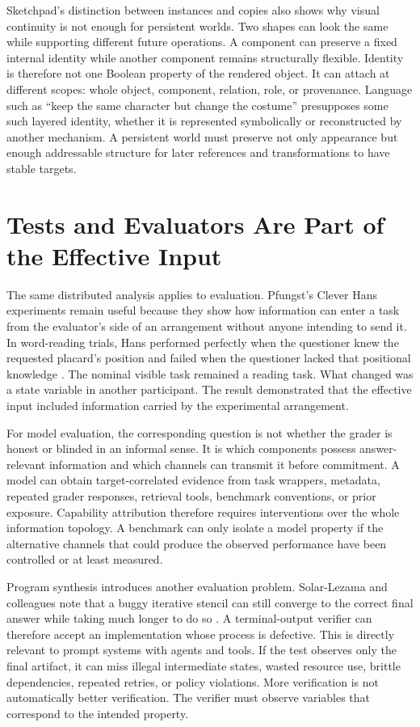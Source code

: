 \documentclass[11pt]{article}
\begin{document}
Sketchpad's distinction between instances and copies also shows why visual continuity is not enough for persistent worlds. Two shapes can look the same while supporting different future operations. A component can preserve a fixed internal identity while another component remains structurally flexible. Identity is therefore not one Boolean property of the rendered object. It can attach at different scopes: whole object, component, relation, role, or provenance. Language such as ``keep the same character but change the costume'' presupposes some such layered identity, whether it is represented symbolically or reconstructed by another mechanism. A persistent world must preserve not only appearance but enough addressable structure for later references and transformations to have stable targets.

\section{Tests and Evaluators Are Part of the Effective Input}

The same distributed analysis applies to evaluation. Pfungst's Clever Hans experiments remain useful because they show how information can enter a task from the evaluator's side of an arrangement without anyone intending to send it. In word-reading trials, Hans performed perfectly when the questioner knew the requested placard's position and failed when the questioner lacked that positional knowledge \citep{pfungst1911clever}. The nominal visible task remained a reading task. What changed was a state variable in another participant. The result demonstrated that the effective input included information carried by the experimental arrangement.

For model evaluation, the corresponding question is not whether the grader is honest or blinded in an informal sense. It is which components possess answer-relevant information and which channels can transmit it before commitment. A model can obtain target-correlated evidence from task wrappers, metadata, repeated grader responses, retrieval tools, benchmark conventions, or prior exposure. Capability attribution therefore requires interventions over the whole information topology. A benchmark can only isolate a model property if the alternative channels that could produce the observed performance have been controlled or at least measured.

Program synthesis introduces another evaluation problem. Solar-Lezama and colleagues note that a buggy iterative stencil can still converge to the correct final answer while taking much longer to do so \citep{solarlezama2007sketching}. A terminal-output verifier can therefore accept an implementation whose process is defective. This is directly relevant to prompt systems with agents and tools. If the test observes only the final artifact, it can miss illegal intermediate states, wasted resource use, brittle dependencies, repeated retries, or policy violations. More verification is not automatically better verification. The verifier must observe variables that correspond to the intended property.
\end{document}
